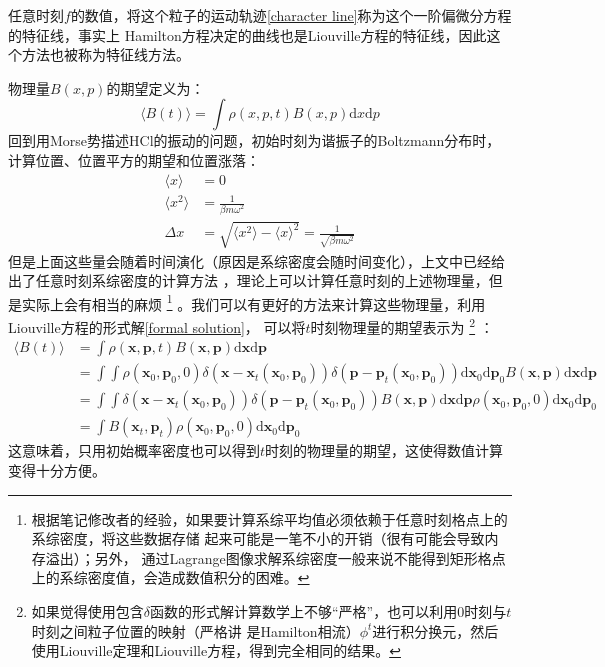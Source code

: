     任意时刻$f$的数值，将这个粒子的运动轨迹\ref{character line}称为这个一阶偏微分方程的特征线，事实上
    Hamilton方程决定的曲线也是Liouville方程的特征线，因此这个方法也被称为特征线方法。
    \par
    物理量$B(x, p)$的期望定义为：
    \begin{equation}
        \langle B(t) \rangle = \int \rho(x,p,t) B(x,p) \mathrm{d}x\mathrm{d}p
    \end{equation}
    回到用Morse势描述HCl的振动的问题，初始时刻为谐振子的Boltzmann分布时，计算位置、位置平方的期望和位置涨落：
    \begin{equation}
        \begin{split}
            \langle x \rangle &= 0\\
            \langle x^2 \rangle &= \frac 1{\beta m \omega^2}\\
            \Delta x &= \sqrt{\langle x^2 \rangle - \langle x \rangle ^2} = \frac 1{\sqrt{\beta m \omega^2}}
        \end{split}
    \end{equation}
    但是上面这些量会随着时间演化（原因是系综密度会随时间变化），上文中已经给出了任意时刻系综密度的计算方法
    ，理论上可以计算任意时刻的上述物理量，但是实际上会有相当的麻烦
    \footnote{
        根据笔记修改者的经验，如果要计算系综平均值必须依赖于任意时刻格点上的系综密度，将这些数据存储
        起来可能是一笔不小的开销（很有可能会导致内存溢出）；另外，
        通过Lagrange图像求解系综密度一般来说不能得到矩形格点上的系综密度值，会造成数值积分的困难。
    }
    。我们可以有更好的方法来计算这些物理量，利用Liouville方程的形式解\ref{formal solution}，
    可以将$t$时刻物理量的期望表示为
    \footnote{
        如果觉得使用包含$\delta$函数的形式解计算数学上不够“严格”，也可以利用0时刻与$t$时刻之间粒子位置的映射（严格讲
        是Hamilton相流）$\phi^t$进行积分换元，然后使用Liouville定理和Liouville方程，得到完全相同的结果。
    }
    ：
    \begin{equation}
        \begin{split}
            \langle B(t) \rangle &= \int \rho(\bm{x},\bm{p},t) B(\bm{x},\bm{p}) \mathrm{d}\bm{x}\mathrm{d}\bm{p}\\
            &= \int \int \rho(\bm{x}_0,\bm{p}_0,0)\delta(\bm{x}-\bm{x}_t(\bm{x}_0,\bm{p}_0)) \delta(\bm{p}-\bm{p}_t(\bm{x}_0,\bm{p}_0)) \mathrm{d}\bm{x}_0\mathrm{d}\bm{p}_0 B(\bm{x},\bm{p}) \mathrm{d}\bm{x}\mathrm{d}\bm{p}\\
            &= \int \int \delta(\bm{x}-\bm{x}_t(\bm{x}_0,\bm{p}_0)) \delta(\bm{p}-\bm{p}_t(\bm{x}_0,\bm{p}_0)) B(\bm{x},\bm{p}) \mathrm{d}\bm{x}\mathrm{d}\bm{p} \rho(\bm{x}_0,\bm{p}_0,0) \mathrm{d}\bm{x}_0\mathrm{d}\bm{p}_0\\
            &= \int B(\bm{x}_t,\bm{p}_t) \rho(\bm{x}_0,\bm{p}_0,0)\mathrm{d}\bm{x}_0\mathrm{d}\bm{p}_0
        \end{split}
    \end{equation}
    这意味着，只用初始概率密度也可以得到$t$时刻的物理量的期望，这使得数值计算变得十分方便。

